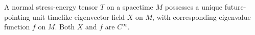 A normal stress-energy tensor $T$ on a spacetime $M$ possesses a unique future-pointing unit timelike eigenvector field $X$ on $M$, with corresponding eigenvalue function $f$ on $M$. Both $X$ and $f$ are $C^\infty$.
